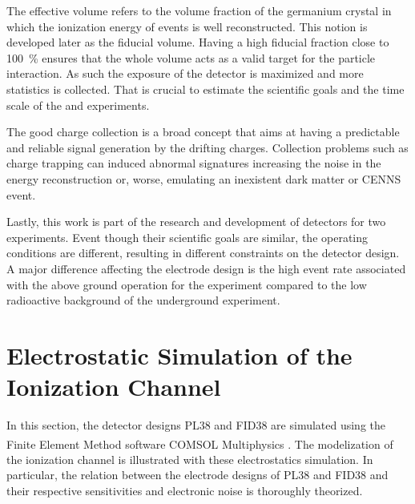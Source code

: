 The effective volume refers to the volume fraction of the germanium crystal in which the ionization energy of events is well reconstructed. This notion is developed later as the fiducial volume. Having a high fiducial fraction close to \SI{100}{\percent} ensures that the whole volume acts as a valid target for the particle interaction. As such the exposure of the detector is maximized and more statistics is collected. That is crucial to estimate the scientific goals and the time scale of the \Ricochet{} and \Edelweiss{} experiments. 

The good charge collection is a broad concept that aims at having a predictable and reliable signal generation by the drifting charges. Collection problems such as charge trapping can induced abnormal signatures increasing the noise in the energy reconstruction or, worse, emulating an inexistent dark matter or CENNS event. 

Lastly, this work is part of the research and development of detectors for two experiments. Event though their scientific goals are similar, the operating conditions are different, resulting in different constraints on the detector design. A major difference affecting the electrode design is the high event rate associated with the above ground operation for the \Ricochet{} experiment compared to the low radioactive background of the underground \Edelweiss{} experiment. 



\section{Electrostatic Simulation of the Ionization Channel}
\label{sec:simulation-ionization}

In this section, the detector designs PL38 and FID38 are simulated using the Finite Element Method software COMSOL\textsuperscript{\textregistered} Multiphysics \cite{comsol}. The modelization of the ionization channel is illustrated with these electrostatics simulation. In particular, the relation between the electrode designs of PL38 and FID38 and their respective sensitivities and electronic noise is thoroughly theorized.

